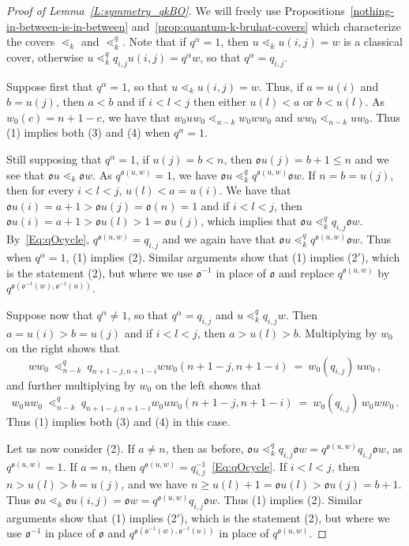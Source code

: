 \documentclass[12pt,oneside,reqno]{amsart}
\theoremstyle{definition}
\numberwithin{equation}{section}
\newcommand{\ncycle}{\mathfrak o}
\begin{document}
\begin{proof}[Proof of Lemma~\ref{L:symmetry_qkBO}]
 We will freely use Propositions~\ref{nothing-in-between-is-in-between} and~\ref{prop:quantum-k-bruhat-covers} which
 characterize the covers $\lessdot_k$ and $\lessdot_k^q$.
 Note that if $q^\alpha=1$, then $u\lessdot_k u(i,j)=w$ is a classical cover, otherwise
 $u\lessdot_k^q  q_{i,j}u(i,j)=q^\alpha w$, so that $q^\alpha=q_{i,j}$.
 
 Suppose first that  $q^\alpha=1$, so that $u\lessdot_k u(i,j)=w$.
 Thus, if $a=u(i)$ and $b=u(j)$, then $a<b$ and if $i<l<j$ then either $u(l)<a$ or $b<u(l)$.
 As $w_0(c)=n{+}1{-}c$, we have that $w_0u w_0 \lessdot_{n-k} w_0 w w_0$ and  $w w_0 \lessdot_{n-k} u w_0$.
 Thus (1) implies both (3) and (4) when $q^\alpha=1$.


 Still supposing that $q^\alpha=1$, if $u(j)=b<n$, then $\ncycle u(j)=b+1\leq n$ and we see that 
 $\ncycle u \lessdot_k \ncycle w$.
 As $q^{\ncycle(u,w)}=1$, we have $\ncycle u \lessdot^q_k q^{\ncycle(u,w)} \ncycle w$.
 If $n=b=u(j)$, then for every $i<l<j$, $u(l)<a=u(i)$.
 We have that $\ncycle u(i)=a+1>\ncycle u(j)=\ncycle(n)=1$ and if  $i<l<j$, then
 $\ncycle u(i)=a{+}1>\ncycle u(l)>1=\ncycle u(j)$, which implies that $\ncycle u \lessdot^q_k q_{i,j} \ncycle w$.
 By~\eqref{Eq:qOcycle}, $q^{\ncycle(u,w)}=q_{i,j}$ and we again have that $\ncycle u \lessdot^q_k q^{\ncycle(u,w)} \ncycle w$.
 Thus when $q^\alpha=1$, (1) implies (2).
 Similar arguments show that (1) implies (2$'$), which is the statement (2), but where we use $\ncycle^{-1}$ in place of
 $\ncycle$ and replace $q^{\ncycle(u,w)}$ by $q^{\ncycle(\ncycle^{-1}(w),\ncycle^{-1}(u))}$. 

 Suppose now that $q^\alpha\neq 1$, so that $q^\alpha=q_{i,j}$ and $u\lessdot^q_k q_{i,j} w$.
 Then $a=u(i)>b=u(j)$ and if $i<l<j$, then $a>u(l)>b$.
 Multiplying by $w_0$ on the right shows that
 \[
     w w_0\ \lessdot^q_{n-k}\ q_{n+1-j,n+1-i} w w_0 (n{+}1-j,n{+}1-i)\ =\  w_0(q_{i,j})\, u w_0\,,
 \]
 and further multiplying by $w_0$ on the left shows that
 \[
    w_0uw_0\  \lessdot^q_{n-k}\  q_{n+1-j,n+1-i} w_0 u w_0  (n{+}1-j,n{+}1-i)\ =\   w_0(q_{i,j})\, w_0 w w_0\,.
 \]
 Thus (1) implies both (3) and (4) in this case.

 Let us now consider (2).
 If $a\neq n$, then as before, $\ncycle u \lessdot_k^q  q_{i,j}\ncycle w=q^{\ncycle(u,w)} q_{i,j}\ncycle w$, as $q^{\ncycle(u,w)}=1$.
 If $a=n$, then $q^{\ncycle(u,w)}=q_{i,j}^{-1}$~\eqref{Eq:qOcycle}.
 If $i<l<j$, then $n>u(l)>b=u(j)$, and we have $n\geq u(l)+1 = \ncycle u(l)>\ncycle u(j)=b+1$.
 Thus $\ncycle u \lessdot_k \ncycle u(i,j)=\ncycle w= q^{\ncycle(u,w)} q_{i,j} \ncycle w$.
 Thus (1) implies (2).
 Similar arguments show that (1) implies (2$'$), which is the statement (2), but where we use $\ncycle^{-1}$ in place of
 $\ncycle$ and  $q^{\ncycle(\ncycle^{-1}(w),\ncycle^{-1}(u))}$ in place of $q^{\ncycle(u,w)}$. 


\end{proof}
\end{document}
